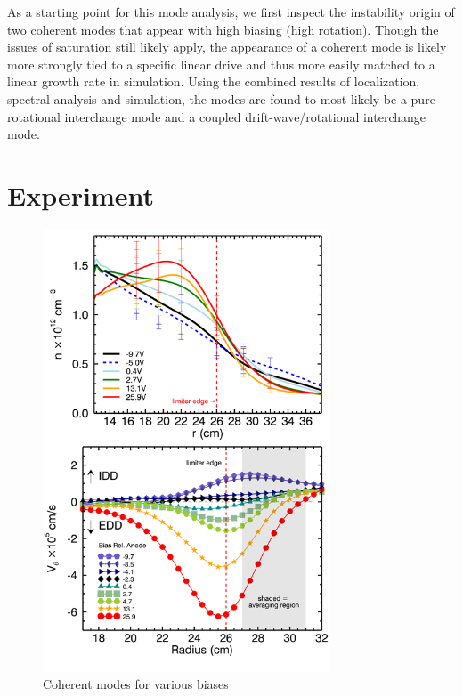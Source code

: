 \documentclass[aip,pop,amsmath,amssymb,reprint,superscriptaddress]{revtex4-1} %
\begin{document}
As a starting point for this mode analysis, we first inspect the instability origin of two coherent modes that appear with high biasing (high rotation). Though the issues of saturation still likely apply, the appearance of a coherent mode is likely more strongly tied to a specific linear drive and thus more easily matched to a linear growth rate in simulation. Using the combined results of localization, spectral analysis and simulation, the modes are found to most likely be a pure rotational interchange mode and a coupled drift-wave/rotational interchange mode.

\section{Experiment}

\begin{figure}[!htbp]
\centerline{
\includegraphics[width=8.5cm]{density_vel_profs_placeholder.png}}%
\caption{\label{fig:density_vel_profs} Coherent modes for various biases}
\end{figure}
\end{document}
